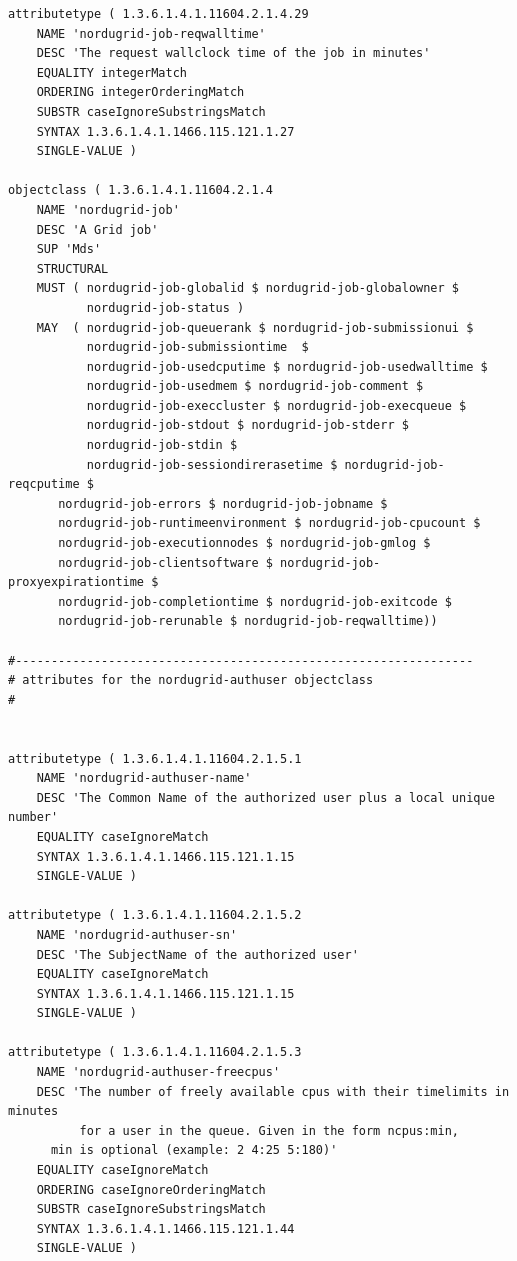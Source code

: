 \documentclass{article}
\begin{document}
\begin{verbatim}
attributetype ( 1.3.6.1.4.1.11604.2.1.4.29
    NAME 'nordugrid-job-reqwalltime'
    DESC 'The request wallclock time of the job in minutes'
    EQUALITY integerMatch
    ORDERING integerOrderingMatch
    SUBSTR caseIgnoreSubstringsMatch
    SYNTAX 1.3.6.1.4.1.1466.115.121.1.27
    SINGLE-VALUE )
           
objectclass ( 1.3.6.1.4.1.11604.2.1.4
    NAME 'nordugrid-job'
    DESC 'A Grid job'
    SUP 'Mds'
    STRUCTURAL
    MUST ( nordugrid-job-globalid $ nordugrid-job-globalowner $
           nordugrid-job-status ) 
    MAY  ( nordugrid-job-queuerank $ nordugrid-job-submissionui $
    	   nordugrid-job-submissiontime  $
    	   nordugrid-job-usedcputime $ nordugrid-job-usedwalltime $
    	   nordugrid-job-usedmem $ nordugrid-job-comment $
    	   nordugrid-job-execcluster $ nordugrid-job-execqueue $
    	   nordugrid-job-stdout $ nordugrid-job-stderr $    	   
    	   nordugrid-job-stdin $ 
    	   nordugrid-job-sessiondirerasetime $ nordugrid-job-reqcputime $
	   nordugrid-job-errors $ nordugrid-job-jobname $
	   nordugrid-job-runtimeenvironment $ nordugrid-job-cpucount $
	   nordugrid-job-executionnodes $ nordugrid-job-gmlog $
	   nordugrid-job-clientsoftware $ nordugrid-job-proxyexpirationtime $
	   nordugrid-job-completiontime $ nordugrid-job-exitcode $
	   nordugrid-job-rerunable $ nordugrid-job-reqwalltime))
	   
#----------------------------------------------------------------
# attributes for the nordugrid-authuser objectclass
#


attributetype ( 1.3.6.1.4.1.11604.2.1.5.1
    NAME 'nordugrid-authuser-name'
    DESC 'The Common Name of the authorized user plus a local unique number'
    EQUALITY caseIgnoreMatch
    SYNTAX 1.3.6.1.4.1.1466.115.121.1.15
    SINGLE-VALUE )
    
attributetype ( 1.3.6.1.4.1.11604.2.1.5.2
    NAME 'nordugrid-authuser-sn'
    DESC 'The SubjectName of the authorized user'
    EQUALITY caseIgnoreMatch
    SYNTAX 1.3.6.1.4.1.1466.115.121.1.15
    SINGLE-VALUE )

attributetype ( 1.3.6.1.4.1.11604.2.1.5.3
    NAME 'nordugrid-authuser-freecpus'
    DESC 'The number of freely available cpus with their timelimits in minutes 
          for a user in the queue. Given in the form ncpus:min,
	  min is optional (example: 2 4:25 5:180)'
    EQUALITY caseIgnoreMatch
    ORDERING caseIgnoreOrderingMatch
    SUBSTR caseIgnoreSubstringsMatch 
    SYNTAX 1.3.6.1.4.1.1466.115.121.1.44
    SINGLE-VALUE )


\end{verbatim}
\end{document}
